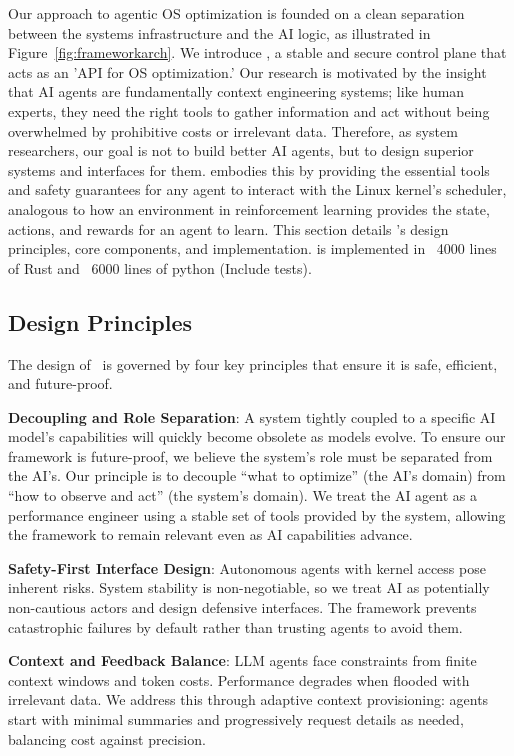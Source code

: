 Our approach to agentic OS optimization is founded on a clean separation between the systems infrastructure and the AI logic, as illustrated in Figure~\ref{fig:frameworkarch}. We introduce \sys, a stable and secure control plane that acts as an 'API for OS optimization.' Our research is motivated by the insight that AI agents are fundamentally context engineering systems; like human experts, they need the right tools to gather information and act without being overwhelmed by prohibitive costs or irrelevant data. Therefore, as system researchers, our goal is not to build better AI agents, but to design superior systems and interfaces for them. \sys embodies this by providing the essential tools and safety guarantees for any agent to interact with the Linux kernel's scheduler, analogous to how an environment in reinforcement learning provides the state, actions, and rewards for an agent to learn. This section details \sys's design principles, core components, and implementation. \sys is implemented in ~4000 lines of Rust and ~6000 lines of python (Include tests).

\subsection{Design Principles}
The design of \sys\ is governed by four key principles that ensure it is safe, efficient, and future-proof.

\textbf{Decoupling and Role Separation}: A system tightly coupled to a specific AI model's capabilities will quickly become obsolete as models evolve. To ensure our framework is future-proof, we believe the system's role must be separated from the AI's. Our principle is to decouple ``what to optimize'' (the AI's domain) from ``how to observe and act'' (the system's domain). We treat the AI agent as a performance engineer using a stable set of tools provided by the system, allowing the framework to remain relevant even as AI capabilities advance.

\textbf{Safety-First Interface Design}: Autonomous agents with kernel access pose inherent risks. System stability is non-negotiable, so we treat AI as potentially non-cautious actors and design defensive interfaces. The framework prevents catastrophic failures by default rather than trusting agents to avoid them.

\textbf{Context and Feedback Balance}: LLM agents face constraints from finite context windows and token costs. Performance degrades when flooded with irrelevant data. We address this through adaptive context provisioning: agents start with minimal summaries and progressively request details as needed, balancing cost against precision.

